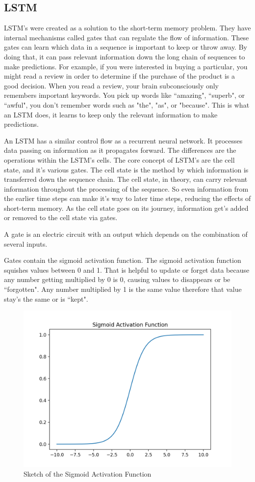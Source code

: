 \subsection{LSTM}
LSTM's were created as a solution to the short-term memory problem. They have internal mechanisms called gates that can regulate the flow of information. These gates can learn which data in a sequence is important to keep or throw away. By doing that, it can pass relevant information down the long chain of sequences to make predictions. For example, if you were interested in buying a particular, you might read a review in order to determine if the purchase of the product is a good decision. When you read a review, your brain subconsciously only remembers important keywords. You pick up words like ``amazing", ``superb", or ``awful", you don't remember words such as "the", "as", or "because". This is what an LSTM does, it learns to keep only the relevant information to make predictions.

An LSTM has a similar control flow as a recurrent neural network. It processes data passing on information as it propagates forward. The differences are the operations within the LSTM’s cells. The core concept of LSTM’s are the cell state, and it’s various gates. The cell state is the method by which information is transferred down the sequence chain. The cell state, in theory, can carry relevant information throughout the processing of the sequence. So even information from the earlier time steps can make it’s way to later time steps, reducing the effects of short-term memory. As the cell state goes on its journey, information get’s added or removed to the cell state via gates\cite{lstm_rnn}.

\begin{definition}
A gate is an electric circuit with an output which depends on the combination of several inputs.
\end{definition}

Gates contain the sigmoid activation function. The sigmoid activation function squishes values between 0 and 1. That is helpful to update or forget data because any number getting multiplied by 0 is 0, causing values to disappears or be ``forgotten". Any number multiplied by 1 is the same value therefore that value stay’s the same or is ``kept".

\begin{figure}[H]
    \centering
    \includegraphics[width=.65\linewidth]{Images/sigmoid.png}
    \caption{Sketch of the Sigmoid Activation Function}
\end{figure}

